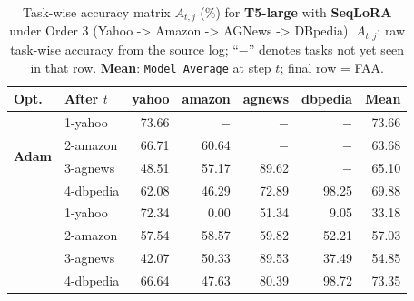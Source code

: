 
\begin{table}[ht]
\centering
\caption{%
  Task-wise accuracy matrix $A_{t,j}$ (\%) for \textbf{T5-large} with \textbf{SeqLoRA} under Order 3 (Yahoo -> Amazon -> AGNews -> DBpedia).
  $A_{t,j}$: raw task-wise accuracy from the source log; ``$-$'' denotes tasks not yet seen in that row.
  \textbf{Mean}: \texttt{Model\_Average} at step $t$; final row = FAA.
}
\label{tab:nlp_o3_t5large_seqlora}
\setlength{\tabcolsep}{4.0pt}
\renewcommand{\arraystretch}{0.92}
\scriptsize
\begin{tabular}{@{}l l r r r r r@{}}
\toprule
\textbf{Opt.} & \textbf{After $t$} & \textbf{yahoo} & \textbf{amazon} & \textbf{agnews} & \textbf{dbpedia} & \textbf{Mean} \\
\midrule
\multirow{4}{*}{\textbf{Adam}} & 1-yahoo & 73.66 & $-$ & $-$ & $-$ & 73.66 \\
 & 2-amazon & 66.71 & 60.64 & $-$ & $-$ & 63.68 \\
 & 3-agnews & 48.51 & 57.17 & 89.62 & $-$ & 65.10 \\
 & 4-dbpedia & 62.08 & 46.29 & 72.89 & 98.25 & 69.88 \\
\addlinespace[2pt]
\multirow{4}{*}{\textbf{SAM}} & 1-yahoo & 72.34 & 0.00 & 51.34 & 9.05 & 33.18 \\
 & 2-amazon & 57.54 & 58.57 & 59.82 & 52.21 & 57.03 \\
 & 3-agnews & 42.07 & 50.33 & 89.53 & 37.49 & 54.85 \\
 & 4-dbpedia & 66.64 & 47.63 & 80.39 & 98.72 & 73.35 \\
\bottomrule
\end{tabular}
\end{table}

